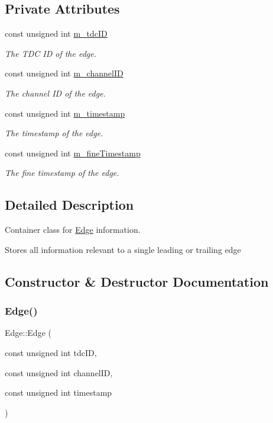 \subsection*{Private Attributes}
\begin{DoxyCompactItemize}
\item 
const unsigned int \hyperlink{class_edge_ae6af56a9eb09e6fcc56032a7c14c6c02}{m\+\_\+tdc\+ID}
\begin{DoxyCompactList}\small\item\em The T\+DC ID of the edge. \end{DoxyCompactList}\item 
const unsigned int \hyperlink{class_edge_af0ac0fc79aff55754ffbd152a2f71452}{m\+\_\+channel\+ID}
\begin{DoxyCompactList}\small\item\em The channel ID of the edge. \end{DoxyCompactList}\item 
const unsigned int \hyperlink{class_edge_a9d018b223c2f920915010a29991b3b3f}{m\+\_\+timestamp}
\begin{DoxyCompactList}\small\item\em The timestamp of the edge. \end{DoxyCompactList}\item 
const unsigned int \hyperlink{class_edge_a62771c5655734e0ea5ebc8e2743130b6}{m\+\_\+fine\+Timestamp}
\begin{DoxyCompactList}\small\item\em The fine timestamp of the edge. \end{DoxyCompactList}\end{DoxyCompactItemize}


\subsection{Detailed Description}
Container class for \hyperlink{class_edge}{Edge} information. 

Stores all information relevant to a single leading or trailing edge 

\subsection{Constructor \& Destructor Documentation}
\mbox{\label{class_edge_afdb566fe3d71b657aa3211783c336a6d}} 
\subsubsection{\texorpdfstring{Edge()}{Edge()}}
{\footnotesize\ttfamily Edge\+::\+Edge (\begin{DoxyParamCaption}\item[{const unsigned int}]{tdc\+ID,  }\item[{const unsigned int}]{channel\+ID,  }\item[{const unsigned int}]{timestamp }\end{DoxyParamCaption})}



